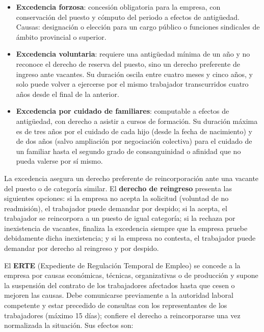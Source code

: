 \documentclass[12pt]{book} %
\providecommand{\tightlist}{%
  \setlength{\itemsep}{0pt}\setlength{\parskip}{0pt}}
\begin{document}
\begin{itemize}
\tightlist
\item
  \textbf{Excedencia forzosa}: concesión obligatoria para la empresa,
  con conservación del puesto y cómputo del periodo a efectos de
  antigüedad. Causas: designación o elección para un cargo público o
  funciones sindicales de ámbito provincial o superior.
\item
  \textbf{Excedencia voluntaria}: requiere una antigüedad mínima de un
  año y no reconoce el derecho de reserva del puesto, sino un derecho
  preferente de ingreso ante vacantes. Su duración oscila entre cuatro
  meses y cinco años, y solo puede volver a ejercerse por el mismo
  trabajador transcurridos cuatro años desde el final de la anterior.
\item
  \textbf{Excedencia por cuidado de familiares}: computable a efectos de
  antigüedad, con derecho a asistir a cursos de formación. Su duración
  máxima es de tres años por el cuidado de cada hijo (desde la fecha de
  nacimiento) y de dos años (salvo ampliación por negociación colectiva)
  para el cuidado de un familiar hasta el segundo grado de
  consanguinidad o afinidad que no pueda valerse por sí mismo.
\end{itemize}

La excedencia asegura un derecho preferente de reincorporación ante una
vacante del puesto o de categoría similar. El \textbf{derecho de
reingreso} presenta las siguientes opciones: si la empresa no acepta la
solicitud (voluntad de no readmisión), el trabajador puede demandar por
despido; si la acepta, el trabajador se reincorpora a un puesto de igual
categoría; si la rechaza por inexistencia de vacantes, finaliza la
excedencia siempre que la empresa pruebe debidamente dicha inexistencia;
y si la empresa no contesta, el trabajador puede demandar por derecho al
reingreso y por despido.

El \textbf{ERTE} (Expediente de Regulación Temporal de Empleo) se
concede a la empresa por causas económicas, técnicas, organizativas o de
producción y supone la suspensión del contrato de los trabajadores
afectados hasta que cesen o mejoren las causas. Debe comunicarse
previamente a la autoridad laboral competente y estar precedido de
consultas con los representantes de los trabajadores (máximo 15 días);
confiere el derecho a reincorporarse una vez normalizada la situación.
Sus efectos son:
\end{document}
